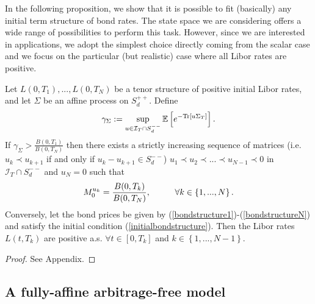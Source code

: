In the following proposition, we show that it is possible to fit (basically) any initial term structure of bond rates. The state space we are considering offers a wide range of possibilities to perform this task. However, since we are interested in applications, we adopt the simplest choice directly coming from the scalar case and we focus on the particular (but realistic) case where all Libor rates are positive.

\begin{proposition}
Let $L(0, T_{1}),...,L(0, T_{N})$ be a tenor structure of positive initial Libor rates, and let $\Sigma$ be an affine process on $S_{d}^{++}$. Define
\begin{equation}
\gamma_{\Sigma}:=\sup_{u \in \mathcal{I}_{T} \cap S_{d}^{--}}\mathbb{E}\left[ e^{-\textup{Tr}\left[u\Sigma_{T}\right]}\right].
\label{gammasigma}\end{equation}
If $\gamma_{\Sigma}>\frac{B(0,T_{1})}{B(0,T_{N})}$ then there exists a strictly increasing sequence of matrices (i.e. $u_{k} \prec u_{k+1}$ if and only if $u_{k}-u_{k+1} \in S_{d}^{--}$) $u_{1} \prec u_{2} \prec ...\prec u_{N-1} \prec 0$ in $\mathcal{I}_{T} \cap S_{d}^{--}$ and $u_N=0$ such that
\begin{equation}
M_{0}^{u_{k}}=\frac{B(0,T_{k})}{B(0,T_{N})},\hspace{10mm}\forall k \in \left\{ 1,...,N\right\}.
\end{equation}
Conversely, let the bond prices be given by (\ref{bondstructure1})-(\ref{bondstructureN})  and satisfy the initial condition (\ref{initialbondstructure}). Then the Libor rates $L(t,T_{k})$ are positive a.s. $\forall t \in \left[0, T_{k} \right]$ and $k\in \left\{ 1,...,N-1\right\}.$
\label{propgamma}\end{proposition}
\begin{proof} See Appendix. \end{proof}



\subsection{A fully-affine arbitrage-free model}

